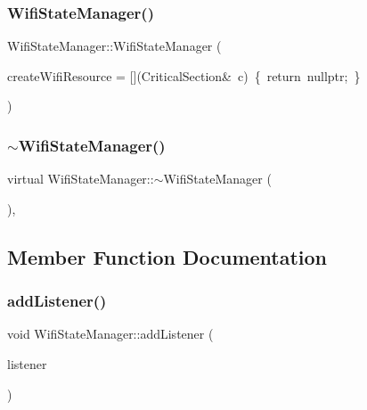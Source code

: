 \subsubsection{\texorpdfstring{Wifi\+State\+Manager()}{WifiStateManager()}}
{\footnotesize\ttfamily Wifi\+State\+Manager\+::\+Wifi\+State\+Manager (\begin{DoxyParamCaption}\item[{std\+::function$<$ \mbox{\hyperlink{classResourceManager_1_1SharedResource}{Resource\+Manager\+::\+Shared\+Resource}} $\ast$(Critical\+Section \&)$>$}]{create\+Wifi\+Resource = {\ttfamily \mbox{[}\mbox{]}(CriticalSection\&~c)~\{~return~nullptr;~\}} }\end{DoxyParamCaption})}

\mbox{\label{classWifiStateManager_ac9f8d530dd059cf2acc357d2e3aadc83}} 
\subsubsection{\texorpdfstring{$\sim$\+Wifi\+State\+Manager()}{~WifiStateManager()}}
{\footnotesize\ttfamily virtual Wifi\+State\+Manager\+::$\sim$\+Wifi\+State\+Manager (\begin{DoxyParamCaption}{ }\end{DoxyParamCaption})\hspace{0.3cm}{\ttfamily [inline]}, {\ttfamily [virtual]}}



\subsection{Member Function Documentation}
\mbox{\label{classWifiStateManager_ac4262cfae2045cef25443fd8dddcd1b3}} 
\subsubsection{\texorpdfstring{add\+Listener()}{addListener()}}
{\footnotesize\ttfamily void Wifi\+State\+Manager\+::add\+Listener (\begin{DoxyParamCaption}\item[{\mbox{\hyperlink{classWifiStateManager_1_1Listener}{Wifi\+State\+Manager\+::\+Listener}} $\ast$}]{listener }\end{DoxyParamCaption})}

